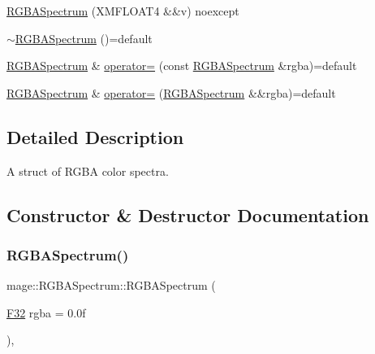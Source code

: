 \begin{DoxyCompactItemize}
\item 
\hyperlink{structmage_1_1_r_g_b_a_spectrum_a623c661a4c99fddc271e994ea4fd3c2f}{R\+G\+B\+A\+Spectrum} (X\+M\+F\+L\+O\+A\+T4 \&\&v) noexcept
\item 
\hyperlink{structmage_1_1_r_g_b_a_spectrum_a0b30d3cdb54965f4e9524904ed5fbf85}{$\sim$\+R\+G\+B\+A\+Spectrum} ()=default
\item 
\hyperlink{structmage_1_1_r_g_b_a_spectrum}{R\+G\+B\+A\+Spectrum} \& \hyperlink{structmage_1_1_r_g_b_a_spectrum_a1b9910f5ce9cb368b88e1b02fb4c4c72}{operator=} (const \hyperlink{structmage_1_1_r_g_b_a_spectrum}{R\+G\+B\+A\+Spectrum} \&rgba)=default
\item 
\hyperlink{structmage_1_1_r_g_b_a_spectrum}{R\+G\+B\+A\+Spectrum} \& \hyperlink{structmage_1_1_r_g_b_a_spectrum_ae23c094db4110804cf4b3bc0a00af131}{operator=} (\hyperlink{structmage_1_1_r_g_b_a_spectrum}{R\+G\+B\+A\+Spectrum} \&\&rgba)=default
\end{DoxyCompactItemize}


\subsection{Detailed Description}
A struct of R\+G\+BA color spectra. 

\subsection{Constructor \& Destructor Documentation}
\hypertarget{structmage_1_1_r_g_b_a_spectrum_ae12e5c982af8385d4cd75bd1b42433f9}{}\label{structmage_1_1_r_g_b_a_spectrum_ae12e5c982af8385d4cd75bd1b42433f9} 
\subsubsection{\texorpdfstring{R\+G\+B\+A\+Spectrum()}{RGBASpectrum()}\hspace{0.1cm}{\footnotesize\ttfamily [1/10]}}
{\footnotesize\ttfamily mage\+::\+R\+G\+B\+A\+Spectrum\+::\+R\+G\+B\+A\+Spectrum (\begin{DoxyParamCaption}\item[{\hyperlink{namespacemage_aa97e833b45f06d60a0a9c4fc22ae02c0}{F32}}]{rgba = {\ttfamily 0.0f} }\end{DoxyParamCaption})\hspace{0.3cm}{\ttfamily [explicit]}, {\ttfamily [noexcept]}}

